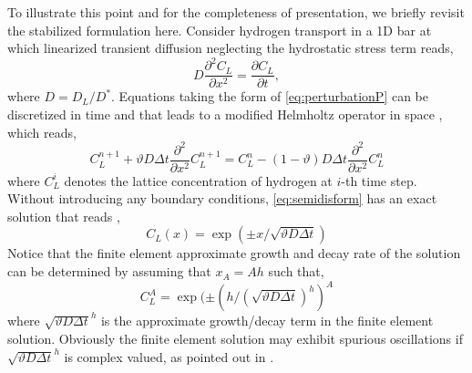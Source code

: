\documentclass[10pt]{elsarticle}
\begin{document}
To illustrate this point and for the completeness of presentation, we briefly revisit the stabilized formulation here. Consider hydrogen transport in a 1D bar at which linearized transient diffusion neglecting the hydrostatic
stress term reads, 
\begin{equation}
\label{eq:perturbationP}  D \frac{ \partial^{2} C_{L} }{\partial x^{2}} =  \frac{\partial C_{L}}{\partial t},
\end{equation} 
where $D=D_{L}/D^{*}$. Equations taking the form of \eqref{eq:perturbationP} can be
discretized in time and that leads to a modified Helmholtz operator in
space \citep{Harari:2004}, which reads,
\begin{equation}
\label{eq:semidisform}
C_{L}^{n+1} + \vartheta  D \Delta t \frac{\partial^{2}}{\partial x^{2} }C_{L}^{n+1} = C_{L}^{n} - (1-\vartheta) D \Delta t \frac{\partial^{2}}{\partial x^{2}} C_{L}^{n} 
\end{equation}
where $C_{L}^{i}$ denotes the lattice concentration of hydrogen at $i$-th time step.
 Without introducing any boundary
conditions, \eqref{eq:semidisform} has an exact solution that reads
\citep{Harari:2004},
\begin{equation}
  \label{eq:FreeexactSol} 
  C_{L}(x) = \exp ( \pm x/\sqrt{\vartheta D \Delta t}) 
\end{equation}
Notice that the finite element approximate growth and decay rate of
the solution can be determined by assuming that $x_{A} = Ah$ such
that,
\begin{equation}
  \label{eq:approxgrow} 
  C_{L}^{A} = \exp ( \pm  (h/  (\sqrt{\vartheta D \Delta t})^{h} )^{A}
\end{equation}
where $\sqrt{\vartheta D \Delta t}^{h} $ is the approximate
growth/decay term in the finite element solution. Obviously the finite
element solution may exhibit spurious oscillations if $\sqrt{\vartheta
  D \Delta t}^{h}$ is complex valued, as pointed out in
\citep{Harari:2004}. 
\end{document}
